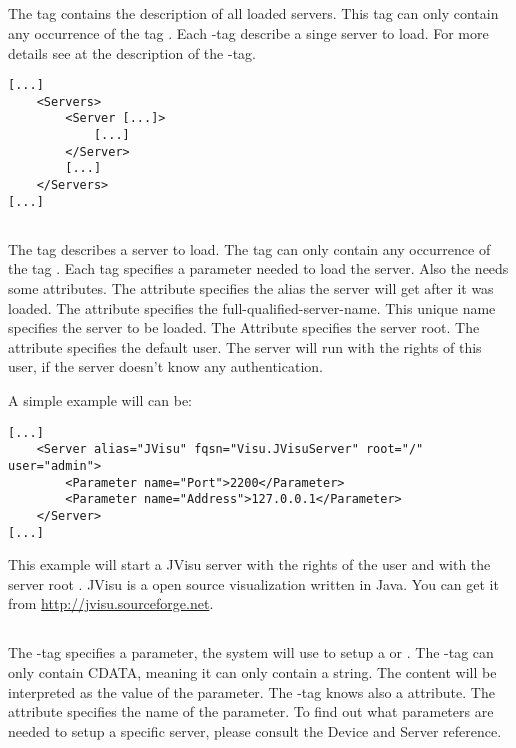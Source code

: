 \subsection{}
The tag  contains the description of all loaded servers. This tag can only 
contain any occurrence of the tag . Each -tag describe a 
singe server to load. For more details see at the description of the -tag.

\begin{verbatim}
[...]
    <Servers>
        <Server [...]>
            [...]
        </Server>
        [...]
    </Servers>
[...]
\end{verbatim}


\subsection{}
The tag  describes a server to load. The tag can only contain any occurrence of the tag
. Each  tag specifies a parameter needed to load the server.
Also the  needs some attributes. The attribute  specifies the alias the
server will get after it was loaded. The attribute  specifies the full-qualified-server-name. 
This unique name specifies the server to be loaded. The Attribute  specifies the server root.
 The attribute 
 specifies the default user. The server will run with the rights of this user, if the 
server doesn't know any authentication. 

A simple example will can be:
\begin{verbatim}
[...]
    <Server alias="JVisu" fqsn="Visu.JVisuServer" root="/" user="admin">
        <Parameter name="Port">2200</Parameter>
        <Parameter name="Address">127.0.0.1</Parameter>
    </Server>
[...]
\end{verbatim}
This example will start a JVisu server with the rights of the user  and
with the server root . JVisu is a open source visualization written in Java.
You can get it from \url{http://jvisu.sourceforge.net}.

\subsection{}
The -tag specifies a parameter, the system will use to setup
a  or . The -tag can only 
contain CDATA, meaning it can only contain a string. The content will be 
interpreted as the value of the parameter. The -tag
knows also a attribute. The attribute  specifies the name
of the parameter. To find out what parameters are needed to setup
a specific server, please consult the Device and Server reference.


